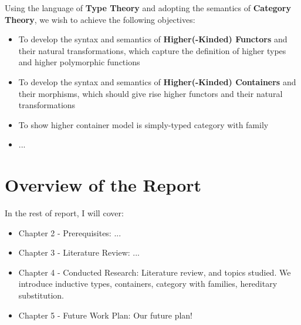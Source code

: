 Using the language of \textbf{Type Theory} and adopting the semantics of \textbf{Category Theory}, we wish to achieve the following objectives:

\begin{itemize}
  \item{To develop the syntax and semantics of \textbf{Higher(-Kinded) Functors} and their natural transformations, which capture the definition of higher types and higher polymorphic functions}
  \item{To develop the syntax and semantics of \textbf{Higher(-Kinded) Containers} and their morphisms, which should give rise higher functors and their natural transformations}
  \item{To show higher container model is simply-typed category with family}
  \item{...}
\end{itemize}

\section{Overview of the Report}

In the rest of report, I will cover:
\begin{itemize}
  \item{Chapter 2 - Prerequisites: ...}
  \item{Chapter 3 - Literature Review: ...}
  \item{Chapter 4 - Conducted Research: Literature review, and topics studied. We introduce inductive types, containers, category with families, hereditary substitution.}
  \item{Chapter 5 - Future Work Plan: Our future plan!}
\end{itemize}

